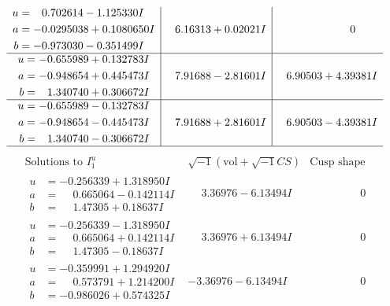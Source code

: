 \documentclass[1p]{elsarticle_modified}
\theoremstyle{definition}
\newcommand{\I}{\sqrt{-1}}
\begin{document}
$$\begin{array}{c|c|c}
\begin{aligned}
u &= \phantom{-}0.702614 - 1.125330 I \\
a &= -0.0295038 + 0.1080650 I \\
b &= -0.973030 - 0.351499 I\end{aligned}
 & \phantom{-}6.16313 + 0.02021 I & \phantom{-0.000000 } 0 \\ \hline\begin{aligned}
u &= -0.655989 + 0.132783 I \\
a &= -0.948654 + 0.445473 I \\
b &= \phantom{-}1.340740 + 0.306672 I\end{aligned}
 & \phantom{-}7.91688 - 2.81601 I & \phantom{-}6.90503 + 4.39381 I \\ \hline\begin{aligned}
u &= -0.655989 - 0.132783 I \\
a &= -0.948654 - 0.445473 I \\
b &= \phantom{-}1.340740 - 0.306672 I\end{aligned}
 & \phantom{-}7.91688 + 2.81601 I & \phantom{-}6.90503 - 4.39381 I\\
 \hline 
 \end{array}$$\newpage$$\begin{array}{c|c|c}  
\text{Solutions to }I^u_{1}& \I (\text{vol} + \sqrt{-1}CS) & \text{Cusp shape}\\
 \hline 
\begin{aligned}
u &= -0.256339 + 1.318950 I \\
a &= \phantom{-}0.665064 - 0.142114 I \\
b &= \phantom{-}1.47305 + 0.18637 I\end{aligned}
 & \phantom{-}3.36976 - 6.13494 I & \phantom{-0.000000 } 0 \\ \hline\begin{aligned}
u &= -0.256339 - 1.318950 I \\
a &= \phantom{-}0.665064 + 0.142114 I \\
b &= \phantom{-}1.47305 - 0.18637 I\end{aligned}
 & \phantom{-}3.36976 + 6.13494 I & \phantom{-0.000000 } 0 \\ \hline\begin{aligned}
u &= -0.359991 + 1.294920 I \\
a &= \phantom{-}0.573791 + 1.214200 I \\
b &= -0.986026 + 0.574325 I\end{aligned}
 & -3.36976 - 6.13494 I & \phantom{-0.000000 } 0 \\ \hline\begin{aligned}

\end{aligned}
\end{array}$$
\end{document}
